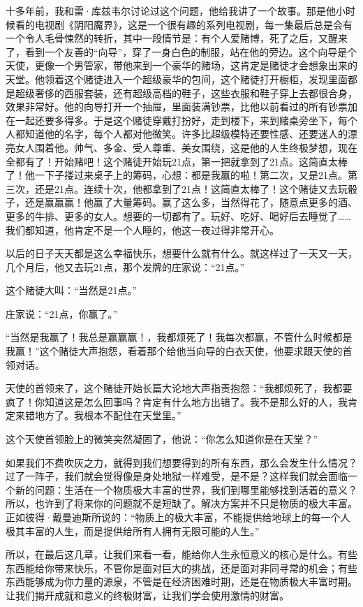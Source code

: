 十多年前，我和雷·库兹韦尔讨论过这个问题，他给我讲了一个故事。那是他小时候看的电视剧《阴阳魔界》，这是一个很有趣的系列电视剧，每一集最后总是会有一个令人毛骨悚然的转折，其中一段情节是：有个人爱赌博，死了之后，又醒来了，看到一个友善的“向导”，穿了一身白色的制服，站在他的旁边。这个向导是个天使，更像一个男管家，带他来到一个豪华的赌场，这肯定是赌徒才会想象出来的天堂。他领着这个赌徒进入一个超级豪华的包间，这个赌徒打开橱柜，发现里面都是超级奢侈的西服套装，还有超级高档的鞋子，这些衣服和鞋子穿上去都很合身，效果非常好。他的向导打开一个抽屉，里面装满钞票，比他以前看过的所有钞票加在一起还要多得多。于是这个赌徒穿戴打扮好，走到楼下，来到赌桌旁坐下，每个人都知道他的名字，每个人都对他微笑。许多比超级模特还要性感、还要迷人的漂亮女人围着他。帅气、多金、受人尊重、美女围绕，这是他的人生终极梦想，现在全都有了！开始赌吧！这个赌徒开始玩21点，第一把就拿到了21点。这简直太棒了！他一下子搂过来桌子上的筹码，心想：都是我赢的啦！第二次，又是21点。第三次，还是21点。连续十次，他都拿到了21点！这简直太棒了！这个赌徒又去玩骰子，还是赢赢赢！他赢了大量筹码。赢了这么多，当然得花了，随意点更多的酒、更多的牛排、更多的女人。想要的一切都有了。玩好、吃好、喝好后去睡觉了……我们都知道，他肯定不是一个人睡的，他这一夜过得非常开心。

以后的日子天天都是这么幸福快乐，想要什么就有什么。就这样过了一天又一天，几个月后，他又去玩21点，那个发牌的庄家说：“21点。”

这个赌徒大叫：“当然是21点。”

庄家说：“21点，你赢了。”

“当然是我赢了！我总是赢赢赢！，我都烦死了！我每次都赢，不管什么时候都是我赢！”这个赌徒大声抱怨，看着那个给他当向导的白衣天使，他要求跟天使的首领对话。

天使的首领来了，这个赌徒开始长篇大论地大声指责抱怨：“我都烦死了，我都要疯了！你知道这是怎么回事吗？肯定有什么地方出错了。我不是那么好的人，我肯定来错地方了。我根本不配住在天堂里。”

这个天使首领脸上的微笑突然凝固了，他说：“你怎么知道你是在天堂？”

如果我们不费吹灰之力，就得到我们想要得到的所有东西，那么会发生什么情况？过了一阵子，我们就会觉得像是身处地狱一样难受，是不是？这样我们就会面临一个新的问题：生活在一个物质极大丰富的世界，我们到哪里能够找到活着的意义？所以，也许到了将来你的问题就不是短缺了。解决方案并不只是物质的极大丰富。正如彼得·戴曼迪斯所说的：“物质上的极大丰富，不能提供给地球上的每一个人极其丰富的人生，而是提供给所有人拥有无限可能的人生。”

所以，在最后这几章，让我们来看一看，能给你人生永恒意义的核心是什么。有些东西能给你带来快乐，不管你是面对巨大的挑战，还是面对非同寻常的机会；有些东西能够成为你力量的源泉，不管是在经济困难时期，还是在物质极大丰富时期。让我们揭开成就和意义的终极财富，让我们学会使用激情的财富。
